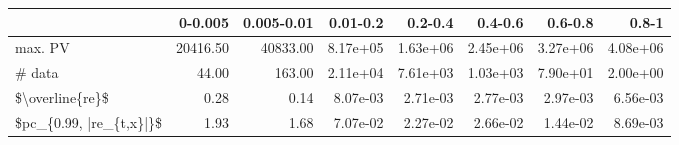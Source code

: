 \begin{tabular}{lrrrrrrr}
\toprule
{} &   0-0.005 &  0.005-0.01 &  0.01-0.2 &   0.2-0.4 &   0.4-0.6 &   0.6-0.8 &     0.8-1 \\
\midrule
max. PV                 &  20416.50 &    40833.00 &  8.17e+05 &  1.63e+06 &  2.45e+06 &  3.27e+06 &  4.08e+06 \\
\# data                  &     44.00 &      163.00 &  2.11e+04 &  7.61e+03 &  1.03e+03 &  7.90e+01 &  2.00e+00 \\
\$\textbackslash overline\{re\}\$         &      0.28 &        0.14 &  8.07e-03 &  2.71e-03 &  2.77e-03 &  2.97e-03 &  6.56e-03 \\
\$pc\_\{0.99, |re\_\{t,x\}|\}\$ &      1.93 &        1.68 &  7.07e-02 &  2.27e-02 &  2.66e-02 &  1.44e-02 &  8.69e-03 \\
\bottomrule
\end{tabular}

